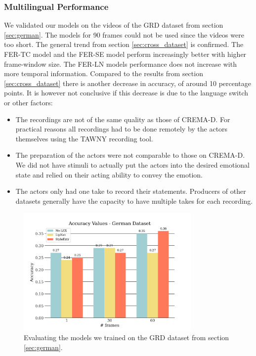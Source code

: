 \subsubsection{Multilingual Performance}
\label{sec:multilingual}
We validated our models on the videos of the GRD dataset from section \ref{sec:german}. The models for 90 frames could not be used since the videos were too short. The general trend from section \ref{sec:cross_dataset} is confirmed. The FER-TC model and the FER-SE model perform increasingly better with higher frame-window size. The FER-LN models performance does not increase with more temporal information. Compared to the results from section \ref{sec:cross_dataset} there is another decrease in accuracy, of around 10 percentage points. It is however not conclusive if this decrease is due to the language switch or other factors:
\begin{itemize}
    \item The recordings are not of the same quality as those of CREMA-D. For practical reasons all recordings had to be done remotely by the actors themselves using the TAWNY recording tool.
    \item The preparation of the actors were not comparable to those on CREMA-D. We did not have stimuli to actually put the actors into the desired emotional state and relied on their acting ability to convey the emotion.
    \item The actors only had one take to record their statements. Producers of other datasets generally have the capacity to have multiple takes for each recording.
\end{itemize}

\begin{figure}
    \centering
    \includegraphics[width=0.8\textwidth]{res/GermanResults.png}
    \caption{Evaluating the models we trained on the GRD dataset from section \ref{sec:german}.}
    \label{fig:german_res}
\end{figure}

